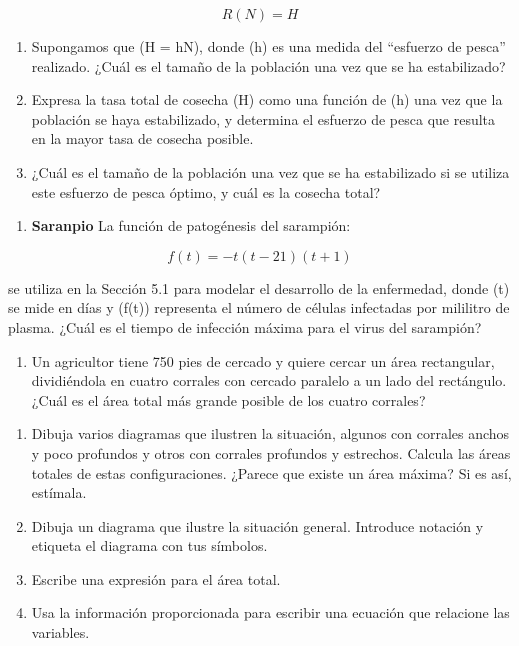\documentclass[
]{article}
\providecommand{\tightlist}{%
  \setlength{\itemsep}{0pt}\setlength{\parskip}{0pt}}\usepackage{longtable,booktabs,array}
\begin{document}
\[
R(N) = H
\]

\begin{enumerate}
\def\labelenumi{\alph{enumi}.}
\item
  Supongamos que (H = hN), donde (h) es una medida del ``esfuerzo de
  pesca'' realizado. ¿Cuál es el tamaño de la población una vez que se
  ha estabilizado?
\item
  Expresa la tasa total de cosecha (H) como una función de (h) una vez
  que la población se haya estabilizado, y determina el esfuerzo de
  pesca que resulta en la mayor tasa de cosecha posible.
\item
  ¿Cuál es el tamaño de la población una vez que se ha estabilizado si
  se utiliza este esfuerzo de pesca óptimo, y cuál es la cosecha total?
\end{enumerate}

\begin{enumerate}
\def\labelenumi{\arabic{enumi}.}
\setcounter{enumi}{9}
\tightlist
\item
  \textbf{Saranpio} La función de patogénesis del sarampión:
\end{enumerate}

\[
f(t) = -t(t - 21)(t + 1)
\]

se utiliza en la Sección 5.1 para modelar el desarrollo de la
enfermedad, donde (t) se mide en días y (f(t)) representa el número de
células infectadas por mililitro de plasma. ¿Cuál es el tiempo de
infección máxima para el virus del sarampión?

\begin{enumerate}
\def\labelenumi{\arabic{enumi}.}
\setcounter{enumi}{10}
\tightlist
\item
  Un agricultor tiene 750 pies de cercado y quiere cercar un área
  rectangular, dividiéndola en cuatro corrales con cercado paralelo a un
  lado del rectángulo. ¿Cuál es el área total más grande posible de los
  cuatro corrales?
\end{enumerate}

\begin{enumerate}
\def\labelenumi{\alph{enumi}.}
\item
  Dibuja varios diagramas que ilustren la situación, algunos con
  corrales anchos y poco profundos y otros con corrales profundos y
  estrechos. Calcula las áreas totales de estas configuraciones. ¿Parece
  que existe un área máxima? Si es así, estímala.
\item
  Dibuja un diagrama que ilustre la situación general. Introduce
  notación y etiqueta el diagrama con tus símbolos.
\item
  Escribe una expresión para el área total.
\item
  Usa la información proporcionada para escribir una ecuación que
  relacione las variables.
\end{enumerate}
\end{document}
